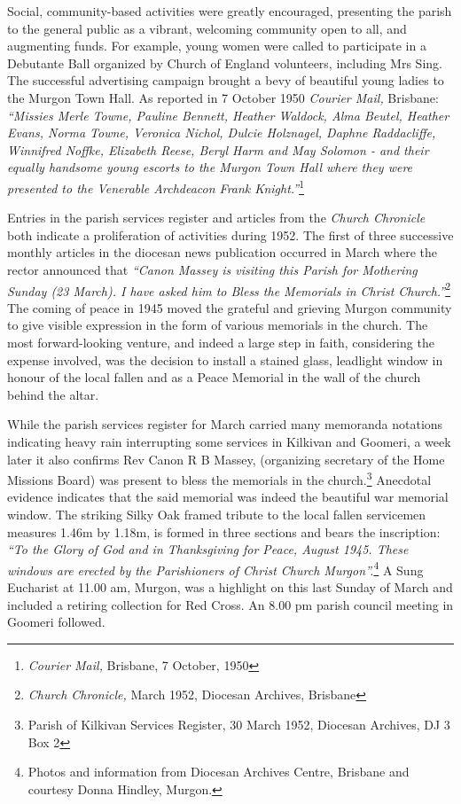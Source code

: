 Social, community-based activities were greatly encouraged, presenting the parish to the general public as a vibrant, welcoming community open to all, and augmenting funds. For example, young women were called to participate in a Debutante Ball organized by Church of England volunteers, including Mrs Sing. The successful advertising campaign brought a bevy of beautiful young ladies to the Murgon Town Hall. As reported in 7 October 1950 \emph{Courier Mail,} Brisbane: \emph{``Missies Merle Towne, Pauline Bennett, Heather Waldock, Alma Beutel, Heather Evans, Norma Towne, Veronica Nichol, Dulcie Holznagel, Daphne Raddacliffe, Winnifred Noffke, Elizabeth Reese, Beryl Harm and May Solomon - and their equally handsome young escorts to the Murgon Town Hall where they were presented to the Venerable Archdeacon Frank Knight.''}\footnote{\emph{Courier Mail,} Brisbane, 7 October, 1950}


Entries in the parish services register and articles from the \emph{Church Chronicle} both indicate a proliferation of activities during 1952. The first of three successive monthly articles in the diocesan news publication occurred in March where the rector announced that \emph{``Canon Massey is visiting this Parish for Mothering Sunday (23 March). I have asked him to Bless the Memorials in Christ Church.''}\footnote{\emph{Church Chronicle,} March 1952, Diocesan Archives, Brisbane} The coming of peace in 1945 moved the grateful and grieving Murgon community to give visible expression in the form of various memorials in the church. The most forward-looking venture, and indeed a large step in faith, considering the expense involved, was the decision to install a stained glass, leadlight window in honour of the local fallen and as a Peace Memorial in the wall of the church behind the altar.


While the parish services register for March carried many memoranda notations indicating heavy rain interrupting some services in Kilkivan and Goomeri, a week later it also confirms Rev Canon R B Massey, (organizing secretary of the Home Missions Board) was present to bless the memorials in the church.\footnote{Parish of Kilkivan Services Register, 30 March 1952, Diocesan Archives, DJ 3 Box 2} Anecdotal evidence indicates that the said memorial was indeed the beautiful war memorial window. The striking Silky Oak framed tribute to the local fallen servicemen measures 1.46m by 1.18m, is formed in three sections and bears the inscription: \emph{``To the Glory of God and in Thanksgiving for Peace, August 1945. These windows are erected by the Parishioners of Christ Church Murgon''.}\footnote{Photos and information from Diocesan Archives Centre, Brisbane and courtesy Donna Hindley, Murgon.} A Sung Eucharist at 11.00 am, Murgon, was a highlight on this last Sunday of March and included a retiring collection for Red Cross. An 8.00 pm parish council meeting in Goomeri followed.








